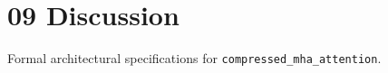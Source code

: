 \section{09 Discussion}

Formal architectural specifications for \texttt{compressed_mha_attention}.
